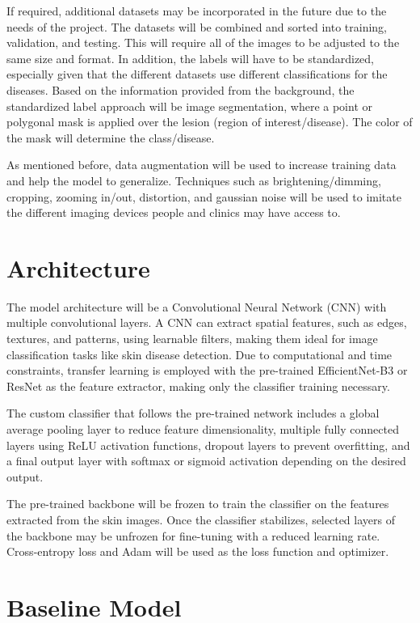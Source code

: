 \documentclass{article} %
\begin{document}
If required, additional datasets may be incorporated in the future due to the needs of the project. The datasets will be combined and sorted into training, validation, and testing. This will require all of the images to be adjusted to the same size and format. In addition, the labels will have to be standardized, especially given that the different datasets use different classifications for the diseases. Based on the information provided from the background, the standardized label approach will be image segmentation, where a point or polygonal mask is applied over the lesion (region of interest/disease). The color of the mask will determine the class/disease.

As mentioned before, data augmentation will be used to increase training data and help the model to generalize. Techniques such as brightening/dimming, cropping, zooming in/out, distortion, and gaussian noise will be used to imitate the different imaging devices people and clinics may have access to.

\section{Architecture}

The model architecture will be a Convolutional Neural Network (CNN) with multiple convolutional layers. A CNN can extract spatial features, such as edges, textures, and patterns, using learnable filters, making them ideal for image classification tasks like skin disease detection. Due to computational and time constraints, transfer learning is employed with the pre-trained EfficientNet-B3 or ResNet as the feature extractor, making only the classifier training necessary.

The custom classifier that follows the pre-trained network includes a global average pooling layer to reduce feature dimensionality, multiple fully connected layers using ReLU activation functions, dropout layers to prevent overfitting, and a final output layer with softmax or sigmoid activation depending on the desired output.

The pre-trained backbone will be frozen to train the classifier on the features extracted from the skin images. Once the classifier stabilizes, selected layers of the backbone may be unfrozen for fine-tuning with a reduced learning rate. Cross-entropy loss and Adam will be used as the loss function and optimizer.

\section{Baseline Model}
\end{document}
